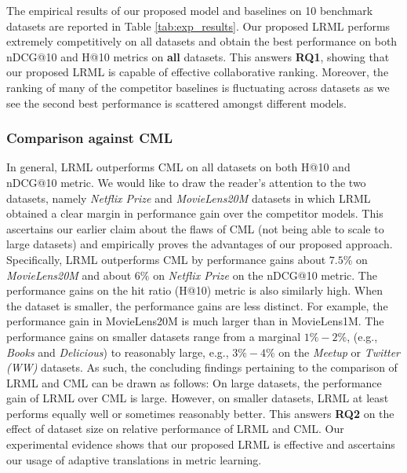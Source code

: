 \documentclass[sigconf]{acmart}
\begin{document}
The empirical results of our proposed model and baselines on 10 benchmark datasets are reported in Table \ref{tab:exp_results}. Our proposed \textsc{LRML} performs extremely competitively on all datasets and obtain the best performance on both nDCG@10 and H@10 metrics on \textbf{all} datasets. This answers \textbf{RQ1}, showing that our proposed \textsc{LRML} is capable of effective collaborative ranking. Moreover, the ranking of many of the competitor baselines is fluctuating across datasets as we see the second best performance is scattered amongst different models. 

\subsubsection{Comparison against CML}
In general, \textsc{LRML} outperforms CML on all datasets on both H@10 and nDCG@10 metric. We would like to draw the reader's attention to the two datasets, namely \textit{Netflix Prize} and \textit{MovieLens20M} datasets in which \textsc{LRML} obtained a clear margin in performance gain over the competitor models. This ascertains our earlier claim about the flaws of CML (not being able to scale to large datasets) and empirically proves the advantages of our proposed approach. Specifically, \textsc{LRML} outperforms CML by performance gains about $7.5\%$ on \textit{MovieLens20M} and about $6\%$ on \textit{Netflix Prize} on the nDCG@10 metric. The performance gains on the hit ratio (H@10) metric is also similarly high. When the dataset is smaller, the performance gains are less distinct. For example, the performance gain in MovieLens20M is much larger than in MovieLens1M. The performance gains on smaller datasets range from a marginal $1\%-2\%$, (e.g., \textit{Books} and \textit{Delicious}) to reasonably large, e.g., $3\%-4\%$ on the \textit{Meetup} or \textit{Twitter (WW)} datasets. As such, the concluding findings pertaining to the comparison of \textsc{LRML} and CML can be drawn as follows: On large datasets, the performance gain of \textsc{LRML} over CML is large. However, on smaller datasets, \textsc{LRML} at least performs equally well or sometimes reasonably better. This answers \textbf{RQ2} on the effect of dataset size on relative performance of LRML and CML. Our experimental evidence shows that our proposed \textsc{LRML} is effective and ascertains our usage of adaptive translations in metric learning. 
\end{document}
